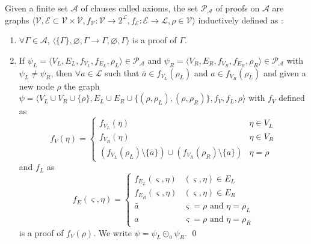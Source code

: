 \documentclass{llncs}
\newcommand{\dual}[1]{{\ensuremath{\bar{#1}}}}
\begin{document}
\begin{definition}[Proof] \label{def:proof}
Given a finite set $\mathcal{A}$ of clauses called axioms, the set $\mathcal{P_A}$ of proofs on
$\mathcal{A}$ are graphs $\langle \mathcal{V},\mathcal{E} \subset \mathcal{V} \times \mathcal{V},
f_\mathcal{V} : \mathcal{V} \longrightarrow 2^\mathcal{L}, f_\mathcal{E} : \mathcal{E}
\longrightarrow \mathcal{L}, \rho \in \mathcal{V} \rangle$ inductively defined as :
\begin{enumerate}[nosep]
  \item $\forall \Gamma \in \mathcal{A}$, $\langle \{\Gamma\}, \varnothing, \Gamma
    \rightarrow \Gamma, \varnothing, \Gamma \rangle$ is a proof of $\Gamma$.
  \item If $\psi_L = \langle V_L, E_L, f_{V_L}, f_{E_L}, \rho_L \rangle \in \mathcal{P_A}$ and
    $\psi_R = \langle V_R, E_R, f_{V_R}, f_{E_R}, \rho_R \rangle \in \mathcal{P_A}$ with $\psi_L
    \neq \psi_R$, then $\forall a \in \mathcal{L}$ such that $\dual{a} \in f_{V_L}(\rho_L)$ and $a
    \in f_{V_R}(\rho_L)$ and given a new node $\rho$ the graph $\psi = \langle V_L \cup V_R \cup
    \{\rho\}, E_L \cup E_R \cup \{(\rho,\rho_L),(\rho,\rho_R)\}, f_V, f_L, \rho \rangle$ with $f_V$
    defined as
    \begin{equation*}
      f_V(\eta) = \begin{cases}
        f_{V_L}(\eta) & \eta \in V_L \\
        f_{V_R}(\eta) & \eta \in V_R \\
        (f_{V_L}(\rho_L) \setminus \{\dual{a}\}) \cup (f_{V_R}(\rho_R) \setminus \{a\}) &
          \eta = \rho
      \end{cases}
    \end{equation*}
    and $f_L$ as
    \begin{equation*}
      f_E(\varsigma,\eta) = \begin{cases}
        f_{E_L}(\varsigma,\eta) & (\varsigma,\eta) \in E_L \\
        f_{E_R}(\varsigma,\eta) & (\varsigma,\eta) \in E_R \\
        \dual{a} & \varsigma = \rho \text{ and } \eta = \rho_L \\
        a        & \varsigma = \rho \text{ and } \eta = \rho_R
      \end{cases}
    \end{equation*}
    is a proof of $f_V(\rho)$. We write $\psi = \psi_L \odot_a \psi_R$.
  \qed
\end{enumerate}
\end{definition}
\end{document}
